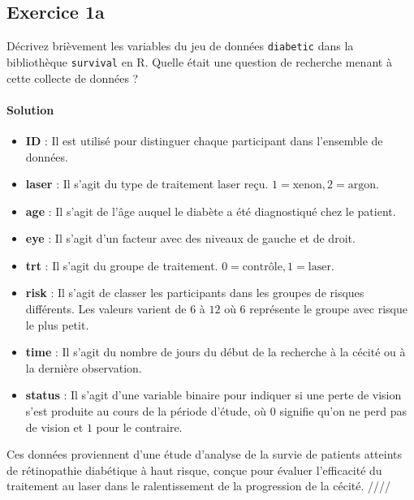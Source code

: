 \documentclass[../main.tex]{subfiles}
\begin{document}
\begin{CJK*}{UTF8}{gbsn}

\section*{Exercice 1a}
Décrivez brièvement les variables du jeu de données 
\texttt{diabetic} dans la bibliothèque \texttt{survival} en R.
Quelle était une question de recherche menant à cette collecte de données ?

\paragraph{Solution}

\begin{itemize}
  \item \textbf{ID} : Il est utilisé pour distinguer chaque participant dans l'ensemble de données.
  \item \textbf{laser} : Il s'agit du type de traitement laser reçu. $1=\text{xenon}, 2=\text{argon}$.
  \item \textbf{age} : Il s'agit de l'âge auquel le diabète a été diagnostiqué chez le patient.
  \item \textbf{eye} : Il s'agit d'un facteur avec des niveaux de gauche et de droit.
  \item \textbf{trt} : Il s'agit du groupe de traitement. $0=\text{contrôle}, 1=\text{laser}$.
  \item \textbf{risk} : Il s'agit de classer les participants dans les groupes de risques différents.
  Les valeurs varient de $6$ à $12$ où $6$ représente le groupe avec risque le plus petit.
  \item \textbf{time} : Il s'agit du nombre de jours du début de la recherche à la cécité 
  ou à la dernière observation.
  \item \textbf{status} : Il s'agit d'une variable binaire 
  pour indiquer si une perte de vision s'est produite au cours de la période d'étude, 
  où $0$ signifie qu'on ne perd pas de vision et $1$ pour le contraire.
\end{itemize}

Ces données proviennent d'une étude d'analyse de 
la survie de patients atteints de rétinopathie diabétique à haut risque, 
conçue pour évaluer l'efficacité du traitement au laser dans le ralentissement de la progression de la cécité. ////

\end{CJK*}
\end{document}
